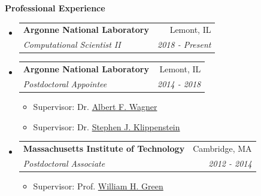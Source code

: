 \documentclass[letterpaper,11pt]{article}
\makeatletter
\newcommand{\resitem}[1]{\item #1 \vspace{-2pt}}
\newcommand{\resheading}[1]{{\large \colorbox{mygrey}{\begin{minipage}{\textwidth}{\textbf{#1 \vphantom{p\^{E}}}}\end{minipage}}}}
\newcommand{\ressubheading}[4]{
\begin{tabular*}{7.0in}{l@{\extracolsep{\fill}}r}
        \textbf{#1} & #2 \\
        \textit{#3} & \textit{#4} \\
\end{tabular*}\vspace{-5pt}}
\makeatother
\begin{document}
\resheading{Professional Experience}
\begin{itemize}
\item
    \ressubheading{Argonne National Laboratory }{Lemont, IL}{ Computational Scientist II} {2018 - Present}
\item
    \ressubheading{Argonne National Laboratory }{Lemont, IL}{Postdoctoral Appointee} {2014 - 2018}
    \begin{itemize}
      \resitem {Supervisor: Dr. \href{http://www.cse.anl.gov/people/resumes/wagner.pdf}{Albert F. Wagner}}
            \resitem {Supervisor: Dr. \href{http://www.anl.gov/profile/stephen-j-klippenstein}{Stephen J. Klippenstein}}
    \end{itemize}
\item
    \ressubheading{Massachusetts Institute of Technology}{Cambridge, MA}{Postdoctoral Associate} {2012 - 2014}
    \begin{itemize}
      \resitem {Supervisor: Prof. \href{http://web.mit.edu/greengp}{William H. Green}}
    \end{itemize}

\end{itemize}
%



%

%




 

%	
	

%
\end{document}
